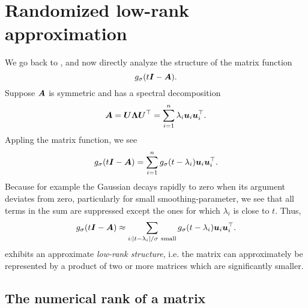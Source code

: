 \chapter{Randomized low-rank approximation}
\label{chp:3-nystrom}

We go back to , and now
directly analyze the structure of the matrix function
\begin{equation}
    g_{\sigma}(t\boldsymbol{I} - \boldsymbol{A}).
    \label{equ:3-nystrom-matrix-function}
\end{equation}
Suppose $\boldsymbol{A}$ is symmetric and has a spectral decomposition
\begin{equation}
    \boldsymbol{A}
        = \boldsymbol{U} \boldsymbol{\Lambda} \boldsymbol{U}^{\top} 
        = \sum_{i=1}^n \lambda_i \boldsymbol{u}_i \boldsymbol{u}_i^{\top}.
    \label{equ:3-nystrom-matrix-spectral-decomposition}
\end{equation}
Appling the matrix function, we see
\begin{equation}
    g_{\sigma}(t\boldsymbol{I} - \boldsymbol{A})
        = \sum_{i=1}^n g_{\sigma}(t - \lambda_i) \boldsymbol{u}_i \boldsymbol{u}_i^{\top}.
    \label{equ:3-nystrom-matrix-function-spectral-decomposition}
\end{equation}
Because for example the Gaussian  
decays rapidly to zero when its argument deviates from zero, particularly for
small \gls{smoothing-parameter}, we see that all terms in the sum 
are suppressed except the ones for which $\lambda_i$ is close to $t$. Thus,
\begin{equation}
    g_{\sigma}(t\boldsymbol{I} - \boldsymbol{A})
        \approx \sum_{i: |t - \lambda_i|/\sigma~\text{small}} g_{\sigma}(t - \lambda_i) \boldsymbol{u}_i \boldsymbol{u}_i^{\top}.
    \label{equ:3-nystrom-matrix-function-low-rank-approximation}
\end{equation}
exhibits an approximate \emph{low-rank structure}, i.e. the matrix can approximately 
be represented by a product of two or more matrices which are significantly smaller.


\section{The numerical rank of a matrix}
\label{sec:3-nystrom-numerical-rank}

